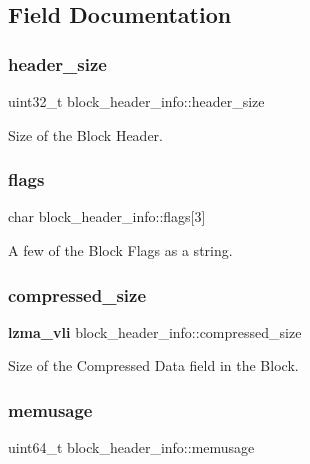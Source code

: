 \subsection{Field Documentation}
\mbox{\label{structblock__header__info_a764fabb6d51c79d8c04cea60da4193fc}} 
\subsubsection{header\+\_\+size}
{\footnotesize\ttfamily uint32\+\_\+t block\+\_\+header\+\_\+info\+::header\+\_\+size}



Size of the Block Header. 

\mbox{\label{structblock__header__info_ac754c2f6877cab774b9236896b274a56}} 
\subsubsection{flags}
{\footnotesize\ttfamily char block\+\_\+header\+\_\+info\+::flags[3]}



A few of the Block Flags as a string. 

\mbox{\label{structblock__header__info_a9b26a3d31384d6780e3fa1634a2ef9c8}} 
\subsubsection{compressed\+\_\+size}
{\footnotesize\ttfamily \textbf{ lzma\+\_\+vli} block\+\_\+header\+\_\+info\+::compressed\+\_\+size}



Size of the Compressed Data field in the Block. 

\mbox{\label{structblock__header__info_a88cb8006bb6751b3beb6fc3502157961}} 
\subsubsection{memusage}
{\footnotesize\ttfamily uint64\+\_\+t block\+\_\+header\+\_\+info\+::memusage}



